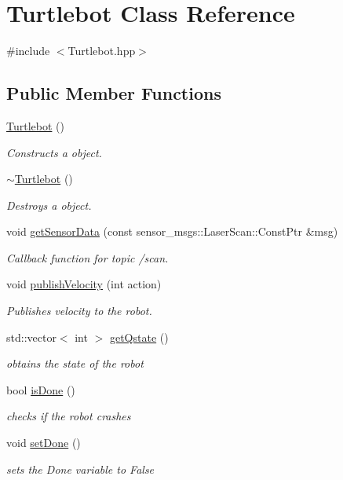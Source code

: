 \hypertarget{classTurtlebot}{}\section{Turtlebot Class Reference}
\label{classTurtlebot}


{\ttfamily \#include $<$Turtlebot.\+hpp$>$}

\subsection*{Public Member Functions}
\begin{DoxyCompactItemize}
\item 
\hyperlink{classTurtlebot_a683061fc512bfb8d2a35134e783767ff}{Turtlebot} ()
\begin{DoxyCompactList}\small\item\em Constructs a object. \end{DoxyCompactList}\item 
\hyperlink{classTurtlebot_a86b905efdcfab4dc1d4c9f7687902f94}{$\sim$\+Turtlebot} ()
\begin{DoxyCompactList}\small\item\em Destroys a object. \end{DoxyCompactList}\item 
void \hyperlink{classTurtlebot_ad30b1bbb44e8cc9d9d7f051beb4c4f98}{get\+Sensor\+Data} (const sensor\+\_\+msgs\+::\+Laser\+Scan\+::\+Const\+Ptr \&msg)
\begin{DoxyCompactList}\small\item\em Callback function for topic /scan. \end{DoxyCompactList}\item 
void \hyperlink{classTurtlebot_ac0ea0124b063cbc0ba8343896c17fb17}{publish\+Velocity} (int action)
\begin{DoxyCompactList}\small\item\em Publishes velocity to the robot. \end{DoxyCompactList}\item 
std\+::vector$<$ int $>$ \hyperlink{classTurtlebot_a768985a081626ef533c4299607ac403d}{get\+Qstate} ()
\begin{DoxyCompactList}\small\item\em obtains the state of the robot \end{DoxyCompactList}\item 
bool \hyperlink{classTurtlebot_a2803edf58b44bffa08c100b8d54ad25e}{is\+Done} ()
\begin{DoxyCompactList}\small\item\em checks if the robot crashes \end{DoxyCompactList}\item 
void \hyperlink{classTurtlebot_ab9129bd2a957b71b10ad5fb49111b7c6}{set\+Done} ()
\begin{DoxyCompactList}\small\item\em sets the Done variable to False \end{DoxyCompactList}\end{DoxyCompactItemize}



